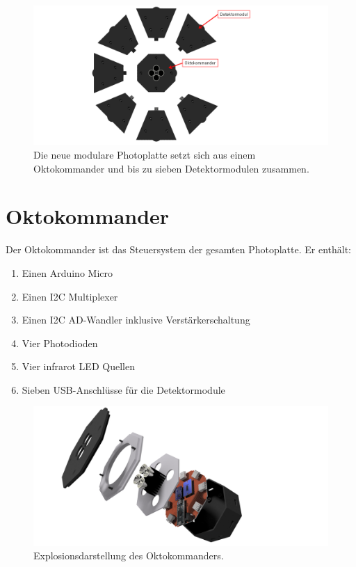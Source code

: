 \documentclass{sciposter}
\begin{document}
\begin{multicols}{3}
\begin{figure}[h]
	\centering
	\includegraphics[scale=0.8]{../CAD_Bilder/Gestikulaser/Gestikulaser_raytraced_2_beschriftet.png}
	\caption{Die neue modulare Photoplatte setzt sich aus einem Oktokommander und bis zu sieben Detektormodulen zusammen.}
	\label{fig:PhotoplatteAlpha}
\end{figure}


\section{Oktokommander}
\noindent
Der Oktokommander ist das Steuersystem der gesamten Photoplatte. Er enthält:
\begin{enumerate}
	\item Einen Arduino Micro
	\item Einen I2C Multiplexer
	\item Einen I2C AD-Wandler inklusive Verstärkerschaltung
	\item Vier Photodioden
	\item Vier infrarot LED Quellen
	\item Sieben USB-Anschlüsse für die Detektormodule
\end{enumerate}

\begin{figure}[h]
	\centering
	\includegraphics[scale=0.5]{../CAD_Bilder/Oktokommander/Oktokommander_raytraced.png}
	\caption{Explosionsdarstellung des Oktokommanders.}
	\label{fig:Oktokommander}
\end{figure}


\end{multicols}
\end{document}
